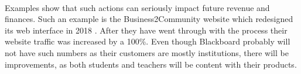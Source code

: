 \documentclass[]{article}
\begin{document}
\paragraph{}
Examples show that such actions can seriously impact future revenue and finances. Such an example is the Business2Community website which redesigned its web interface in 2018 \cite{Redesign-case-study}. After they have went through with the process their website traffic was increased by a 100\%. Even though Blackboard probably will not have such numbers as their customers are mostly institutions, there will be improvements, as both students and teachers will be content with their products. 
\newpage



\printbibliography{}
\end{document}
